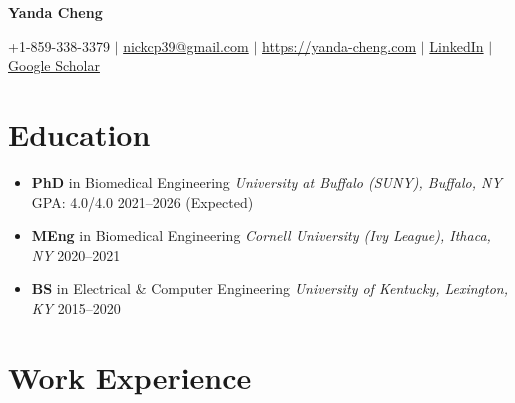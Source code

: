 \documentclass[letterpaper,10pt]{article}
\begin{document}


\begin{center}
  {\huge \textbf{Yanda Cheng}}
\end{center}
\vspace{4pt}
\noindent\small
+1-859-338-3379 \quad$|$\quad
\href{mailto:nickcp39@gmail.com}{nickcp39@gmail.com} \quad$|$\quad
\href{https://yanda-cheng.com}{https://yanda-cheng.com} \quad$|$\quad
\href{https://www.linkedin.com/in/yanda-cheng-4888a216b}{LinkedIn} \quad$|$\quad
\href{https://scholar.google.com/citations?user=XkNfimMAAAAJ&hl=en}{Google Scholar}

\vspace{-4pt}

\section{Education}

\begin{itemize}[leftmargin=0.0in, label={}, itemsep=2pt, topsep=2pt]
  \item \textbf{PhD} in Biomedical Engineering \hfill \textit{University at Buffalo (SUNY), Buffalo, NY} \hfill GPA: 4.0/4.0 \hfill 2021--2026 (Expected)
  \item \textbf{MEng} in Biomedical Engineering \hfill \textit{Cornell University (Ivy League), Ithaca, NY} \hfill 2020--2021
  \item \textbf{BS} in Electrical \& Computer Engineering \hfill \textit{University of Kentucky, Lexington, KY} \hfill 2015--2020
\end{itemize}

\vspace{-2pt}

\section{Work Experience}
\end{document}
